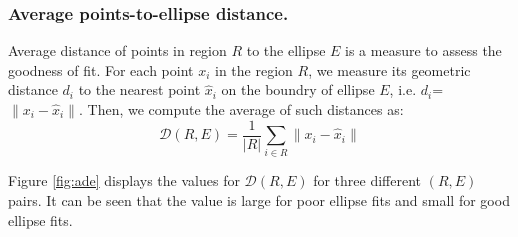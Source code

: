 \documentclass[preprint]{iucr}              %
\newcommand{\norm}[1]{\left\lVert #1 \right\rVert}
\begin{document}
\subsubsection{Average points-to-ellipse distance.}
Average distance of points in region $R$ to the ellipse $E$ is a measure to
assess the goodness of fit. 
For each point $x_i$ in the region $R$, we measure its geometric distance $d_i$
to the nearest point $\hat{x}_i$ on the boundry of ellipse $E$, i.e.
$d_i$=$\norm{x_i - \hat{x}_i}$.  
Then, we compute the average of such distances as:
\begin{equation} \label{eq:ADE}
    \mathcal{D}(R,E) = \frac{1}{\lvert R \rvert}  \sum_{i \in R} \norm{x_i -
    \hat{x}_i} 
\end{equation}

Figure \ref{fig:ade} displays the values for $\mathcal{D}(R,E)$ for three
different $(R, E)$ pairs. 
It can be seen that the value is large for poor ellipse fits and small for good
ellipse fits. 
\end{document}
